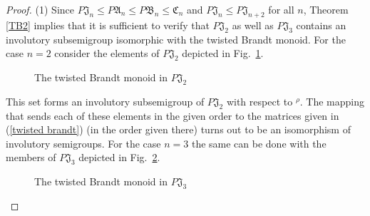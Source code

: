 \documentclass[preprint,1p,times]{elsarticle}
\numberwithin{equation}{section}
\theoremstyle{remark}
\def\A{\mathfrak{A}}
\def\C{\mathfrak{C}}
\def\B{\mathfrak{B}}
\def\J{\mathfrak{J}}
\begin{document}
\begin{proof}
(1) Since $P\J_n\le P\A_n\le P\B_n\le\C_n$ and $P\J_n\le P\J_{n+2}$ for all $n$, Theorem \ref{TB2} implies that it is
sufficient to verify that $P\J_2$ as well as $P\J_3$ contains an involutory subsemigroup isomorphic with the twisted
Brandt monoid. For the case $n=2$ consider the elements of $P\J_2$ depicted in Fig.\ \ref{tbc2}.

\begin{figure}[hb]
\centering
\caption[Twisted Brandt Monoid]{The twisted Brandt monoid in $P\J_2$}\label{tbc2}
\end{figure}
This set forms an involutory subsemigroup of $P\J_2$ with respect to $^\rho$. The mapping that sends each of these
elements in the given order to the matrices given in  (\ref{twisted brandt}) (in the order given there) turns out to be
an isomorphism of involutory semigroups. For the case $n=3$ the same can be done with the members of $P\J_3$ depicted
in Fig.\ \ref{tbc3}.
\begin{figure}[h]
\centering
{}
\caption{The twisted Brandt monoid in $P\J_3$}\label{tbc3}
\end{figure}


\end{proof}
\end{document}
